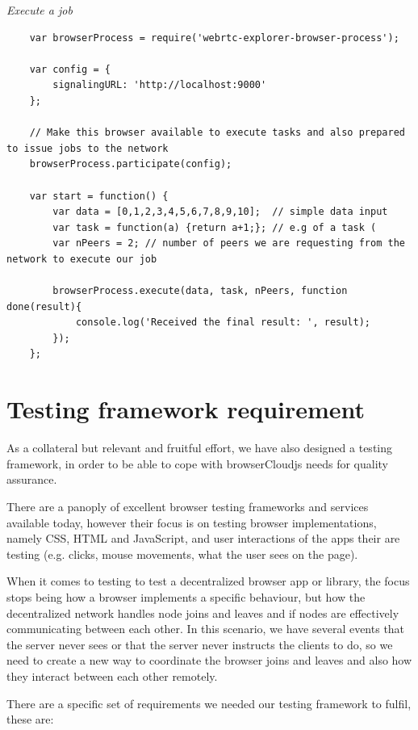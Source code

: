 \textit{Execute a job}
\begingroup
\scriptsize
\begin{verbatim}
    var browserProcess = require('webrtc-explorer-browser-process');

    var config = {
        signalingURL: 'http://localhost:9000'
    };
    
    // Make this browser available to execute tasks and also prepared to issue jobs to the network
    browserProcess.participate(config);

    var start = function() {
        var data = [0,1,2,3,4,5,6,7,8,9,10];  // simple data input
        var task = function(a) {return a+1;}; // e.g of a task (
        var nPeers = 2; // number of peers we are requesting from the network to execute our job
        
        browserProcess.execute(data, task, nPeers, function done(result){
            console.log('Received the final result: ', result); 
        });
    };
\end{verbatim}
\endgroup

\section{Testing framework requirement}

As a collateral but relevant and fruitful effort, we have also designed a testing framework, in order to be able to cope with browserCloudjs needs for quality assurance. 

There are a panoply of excellent browser testing frameworks and services available today, however their focus is on testing browser implementations, namely CSS, HTML and JavaScript, and user interactions of the apps their are testing (e.g. clicks, mouse movements, what the user sees on the page).

When it comes to testing to test a decentralized browser app or library, the focus stops being how a browser implements a specific behaviour, but how the decentralized network handles node joins and leaves and if nodes are effectively communicating between each other. In this scenario, we have several events that the server never sees or that the server never instructs the clients to do, so we need to create a new way to coordinate the browser joins and leaves and also how they interact between each other remotely.

There are a specific set of requirements we needed our testing framework to fulfil, these are:

